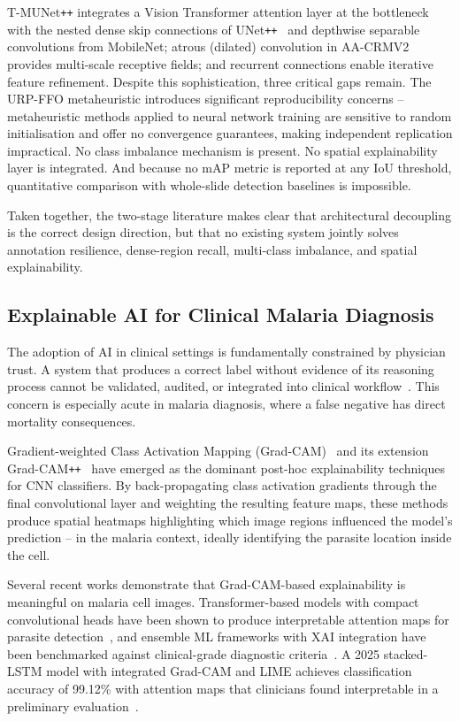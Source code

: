 \documentclass[10pt,twocolumn]{article}
\begin{document}
T-MUNet\texttt{++} integrates a Vision Transformer attention layer at
the bottleneck with the nested dense skip connections of
UNet\texttt{++}~\cite{zhou2018unetpp} and depthwise separable
convolutions from MobileNet; atrous (dilated) convolution in AA-CRMV2
provides multi-scale receptive fields; and recurrent connections enable
iterative feature refinement. Despite this sophistication, three
critical gaps remain. The URP-FFO metaheuristic introduces significant
reproducibility concerns -- metaheuristic methods applied to neural
network training are sensitive to random initialisation and offer no
convergence guarantees, making independent replication impractical.
No class imbalance mechanism is present. No spatial explainability
layer is integrated. And because no mAP metric is reported at any IoU
threshold, quantitative comparison with whole-slide detection baselines
is impossible.

Taken together, the two-stage literature makes clear that architectural
decoupling is the correct design direction, but that no existing system
jointly solves annotation resilience, dense-region recall, multi-class
imbalance, and spatial explainability.

\subsection{Explainable AI for Clinical Malaria Diagnosis}
\label{ssec:xai}

The adoption of AI in clinical settings is fundamentally constrained by
physician trust. A system that produces a correct label without evidence
of its reasoning process cannot be validated, audited, or integrated
into clinical workflow~\cite{trustworthy2025}. This concern is especially
acute in malaria diagnosis, where a false negative has direct mortality
consequences.

Gradient-weighted Class Activation Mapping (Grad-CAM)~\cite{selvaraju2017}
and its extension Grad-CAM\texttt{++}~\cite{chattopadhyay2018} have
emerged as the dominant post-hoc explainability techniques for CNN
classifiers. By back-propagating class activation gradients through the
final convolutional layer and weighting the resulting feature maps,
these methods produce spatial heatmaps highlighting which image regions
influenced the model's prediction -- in the malaria context, ideally
identifying the parasite location inside the cell.

Several recent works demonstrate that Grad-CAM-based explainability
is meaningful on malaria cell images. Transformer-based models
with compact convolutional heads have been shown to produce interpretable
attention maps for parasite detection~\cite{xai2022transformer}, and
ensemble ML frameworks with XAI integration have been benchmarked against
clinical-grade diagnostic criteria~\cite{xai_ensemble2025}. A 2025
stacked-LSTM model with integrated Grad-CAM and LIME achieves
classification accuracy of 99.12\% with attention maps that clinicians
found interpretable in a preliminary evaluation~\cite{lstm_xai2025}.
\end{document}
